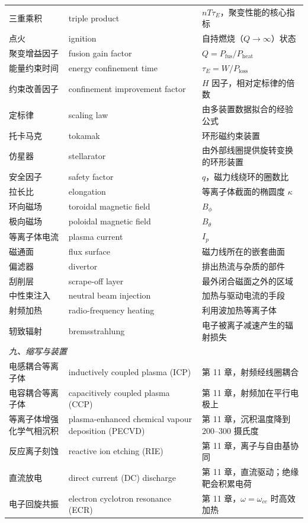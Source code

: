 \documentclass[12pt,a4paper,openany,oneside]{book}
\begin{document}
{\begin{longtable}{@{}p{4.2cm}p{5.6cm}p{4.8cm}@{}}
三重乘积 & triple product & $nT\tau_E$，聚变性能的核心指标 \\
点火 & ignition & 自持燃烧（$Q\to\infty$）状态 \\
聚变增益因子 & fusion gain factor & $Q = P_{\text{fus}}/P_{\text{heat}}$ \\
能量约束时间 & energy confinement time & $\tau_E = W/P_{\text{loss}}$ \\
约束改善因子 & confinement improvement factor & $H$ 因子，相对定标律的倍数 \\
定标律 & scaling law & 由多装置数据拟合的经验公式 \\
托卡马克 & tokamak & 环形磁约束装置 \\
仿星器 & stellarator & 由外部线圈提供旋转变换的环形装置 \\
安全因子 & safety factor & $q$，磁力线绕环的圈数比 \\
拉长比 & elongation & 等离子体截面的椭圆度 $\kappa$ \\
环向磁场 & toroidal magnetic field & $B_\phi$ \\
极向磁场 & poloidal magnetic field & $B_\theta$ \\
等离子体电流 & plasma current & $I_p$ \\
磁通面 & flux surface & 磁力线所在的嵌套曲面 \\
偏滤器 & divertor & 排出热流与杂质的部件 \\
刮削层 & scrape-off layer & 最外闭合磁面之外的区域 \\
中性束注入 & neutral beam injection & 加热与驱动电流的手段 \\
射频加热 & radio-frequency heating & 利用波加热等离子体 \\
轫致辐射 & bremsstrahlung & 电子被离子减速产生的辐射损失 \\
\multicolumn{3}{l}{\textit{九、缩写与装置}} \\
\midrule
电感耦合等离子体 & inductively coupled plasma (ICP) & 第 11 章，射频经线圈耦合 \\
电容耦合等离子体 & capacitively coupled plasma (CCP) & 第 11 章，射频加在平行电极上 \\
等离子体增强化学气相沉积 & plasma-enhanced chemical vapour deposition (PECVD) & 第 11 章，沉积温度降到 $200$--$300$ 摄氏度 \\
反应离子刻蚀 & reactive ion etching (RIE) & 第 11 章，离子与自由基协同 \\
直流放电 & direct current (DC) discharge & 第 11 章，直流驱动；绝缘靶会积累电荷 \\
电子回旋共振 & electron cyclotron resonance (ECR) & 第 11 章，$\omega=\omega_{ce}$ 时高效加热 \\

\end{longtable}}
\end{document}

